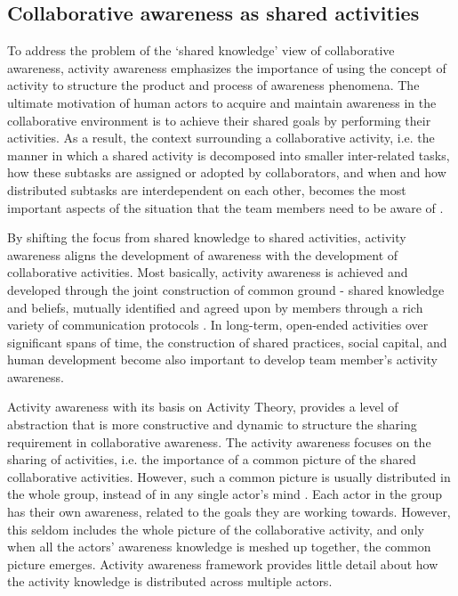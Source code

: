 \subsection{Collaborative awareness as shared activities} %
\label{sub:activity_awareness}
To address the problem of the `shared knowledge' view of collaborative awareness, activity awareness \cite{carroll2003a,carroll2006a} emphasizes the importance of using the concept of activity to structure the product and process of awareness phenomena. The ultimate motivation of human actors to acquire and maintain awareness in the collaborative environment is to achieve their shared goals by performing their activities. As a result, the context surrounding a collaborative activity, i.e. the manner in which a shared activity is decomposed into smaller inter-related tasks, how these subtasks are assigned or adopted by collaborators, and when and how distributed subtasks are interdependent on each other, becomes the most important aspects of the situation that the team members need to be aware of \cite{carroll2003a}.

By shifting the focus from shared knowledge to shared activities, activity awareness aligns the development of awareness with the development of collaborative activities. Most basically, activity awareness is achieved and developed through the joint construction of common ground - shared knowledge and beliefs, mutually identified and agreed upon by members through a rich variety of communication protocols \cite{carroll2006a}. In long-term, open-ended activities over significant spans of time, the construction of shared practices, social capital, and human development become also important to develop team member's activity awareness.

Activity awareness with its basis on Activity Theory, provides a level of abstraction that is more constructive and dynamic to structure the sharing requirement in collaborative awareness. The activity awareness focuses on the sharing of activities, i.e. the importance of a common picture of the shared collaborative activities. However, such a common picture is usually distributed in the whole group, instead of in any single actor's mind \cite{Stanton2009}. Each actor in the group has their own awareness, related to the goals they are working towards. However, this seldom includes the whole picture of the collaborative activity, and only when all the actors' awareness knowledge is meshed up together, the common picture emerges. Activity awareness framework provides little detail about how the activity knowledge is distributed across multiple actors.

